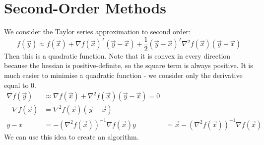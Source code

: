 \documentclass[../Main.tex]{subfiles}
\begin{document}
\section{Second-Order Methods}
We consider the Taylor series approximation to second order:
\begin{equation*}
    f(\vec{y}) \approx f(\vec{x}) + \nabla f(\vec{x})^T (\vec{y} - \vec{x}) + \frac{1}{2} (\vec{y} - \vec{x})^T \nabla^2 f(\vec{x}) (\vec{y} - \vec{x})
\end{equation*}
Then this is a quadratic function. Note that it is convex in every direction because the hessian is positive-definite, so the square term is always positive. It is much easier to minimise a quadratic function - we consider only the derivative equal to 0.
\begin{align*}
    \nabla f(\vec{y}) &\approx \nabla f(\vec{x}) + \nabla^2 f(\vec{x}) (\vec{y} - \vec{x}) = 0 \\
    -\nabla f(\vec{x}) &= \nabla^2 f(\vec{x}) (\vec{y} - \vec{x}) \\
    y - x &= -\left(\nabla^2 f(\vec{x})\right)^{-1} \nabla f(\vec{x})
    y &= \vec{x} - \left(\nabla^2 f(\vec{x})\right)^{-1} \nabla f(\vec{x})
\end{align*}
We can use this idea to create an algorithm.
\end{document}
